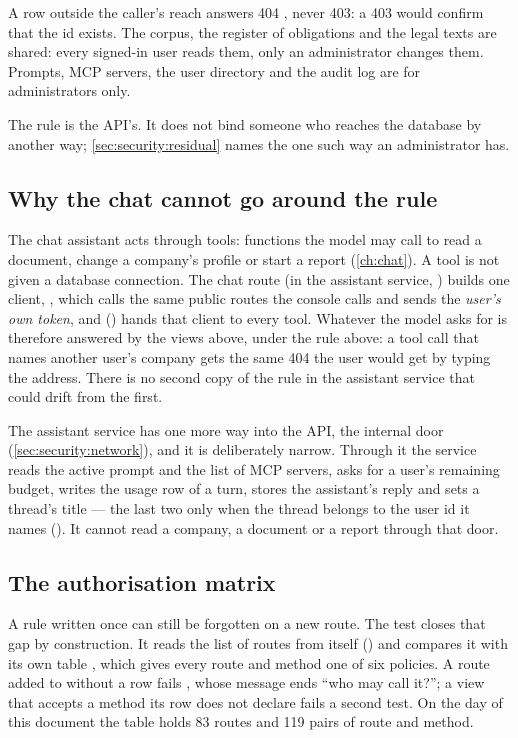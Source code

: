 A row outside the caller's reach answers 404 , never 403: a 403 would confirm
that the id exists. The corpus, the register of obligations and the legal texts are shared:
every signed-in user reads them, only an administrator changes them. Prompts, MCP servers,
the user directory and the audit log are for administrators only.

The rule is the API's. It does not bind someone who reaches the database by another way;
\cref{sec:security:residual} names the one such way an administrator has.

\subsection{Why the chat cannot go around the rule}

The chat assistant acts through tools: functions the model may call to read a document,
change a company's profile or start a report (\cref{ch:chat}). A tool is not given a database
connection. The chat route (in the assistant service, ) builds one
client, , which calls the same public routes the console calls and sends
the \emph{user's own token}, and  () hands that client
to every tool. Whatever the model asks for is therefore answered by the
views above, under the rule above: a tool call that names another user's company gets the
same 404 the user would get by typing the address. There is no second copy of the rule in
the assistant service that could drift from the first.

The assistant service has one more way into the API, the internal door
(\cref{sec:security:network}), and it is deliberately narrow. Through it the service reads the
active prompt and the list of MCP servers, asks for a user's remaining budget, writes the
usage row of a turn, stores the assistant's reply and sets a thread's title --- the last two
only when the thread belongs to the user id it names ().
It cannot read a company, a document or a report through that door.

\subsection{The authorisation matrix}

A rule written once can still be forgotten on a new route. The test
 closes that gap by construction. It reads the list of
routes from  itself () and compares it with its own table
, which gives every route and method one of six policies. A route added to
 without a row fails , whose message ends
\enquote{who may call it?}; a view that accepts a method its row does not declare fails a
second test. On the day of this document the table holds 83 routes and 119 pairs of route
and method.

